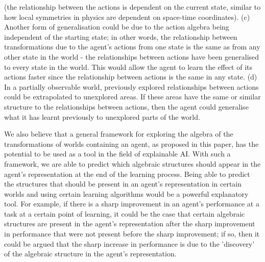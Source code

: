 (the relationship between the actions is dependent on the current state, similar to how local symmetries in physics are dependent on space-time coordinates).
(c) Another form of generalisation could be due to the action algebra being independent of the starting state; in other words, the relationship between transformations due to the agent's actions from one state is the same as from any other state in the world - the relationships between actions have been generalised to every state in the world.
This would allow the agent to learn the effect of its actions faster since the relationship between actions is the same in any state.
(d) In a partially observable world, previously explored relationships between actions could be extrapolated to unexplored areas.
If these areas have the same or similar structure to the relationships between actions, then the agent could generalise what it has learnt previously to unexplored parts of the world.

We also believe that a general framework for exploring the algebra of the transformations of worlds containing an agent, as proposed in this paper, has the potential to be used as a tool in the field of explainable AI.
With such a framework, we are able to predict which algebraic structures should appear in the agent's representation at the end of the learning process.
Being able to predict the structures that should be present in an agent's representation in certain worlds and using certain learning algorithms would be a powerful explanatory tool.
For example, if there is a sharp improvement in an agent's performance at a task at a certain point of learning, it could be the case that certain algebraic structures are present in the agent's representation after the sharp improvement in performance that were not present before the sharp improvement; if so, then it could be argued that the sharp increase in performance is due to the 'discovery' of the algebraic structure in the agent's representation.


